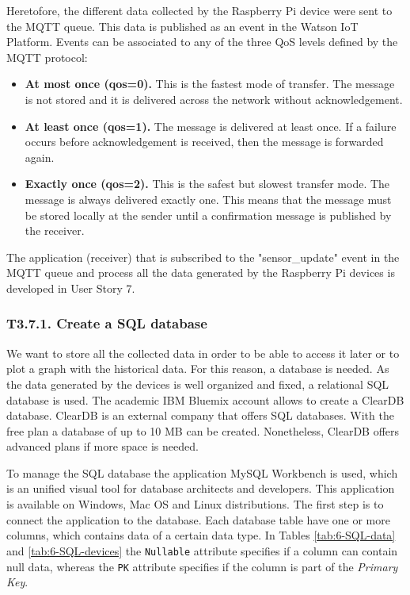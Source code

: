 Heretofore, the different data collected by the Raspberry Pi device were sent to the MQTT queue. This data is published as an event in the Watson \ac{IoT} Platform. Events can be associated to any of the three \ac{QoS} levels defined by the MQTT protocol:
\begin{itemize}
	\item \textbf{At most once (qos=0).} This is the fastest mode of transfer. The message is not stored and it is delivered across the network without acknowledgement.
	\item \textbf{At least once (qos=1).} The message is delivered at least once. If a failure occurs before acknowledgement is received, then the message is forwarded again.
	\item \textbf{Exactly once (qos=2).} This is the safest but slowest transfer mode. The message is always delivered exactly one. This means that the message must be stored locally at the sender until a confirmation message is published by the receiver.
\end{itemize}

The application (receiver) that is subscribed to the "sensor\_update" event in the MQTT queue and process all the data generated by the Raspberry Pi devices is developed in User Story 7.


\subsubsection{T3.7.1. Create a SQL database}

We want to store all the collected data in order to be able to access it later or to plot a graph with the historical data. For this reason, a database is needed. As the data generated by the devices is well organized and fixed, a relational SQL database is used. The academic IBM Bluemix account allows to create a ClearDB database. ClearDB is an external company that offers SQL databases. With the free plan a database of up to 10 MB can be created. Nonetheless, ClearDB offers advanced plans if more space is needed.

To manage the SQL database the application MySQL Workbench is used, which is an unified visual tool for database architects and developers. This application is available on Windows, Mac OS and Linux distributions. The first step is to connect the application to the database. Each database table have one or more columns, which contains data of a certain data type. In Tables \ref{tab:6-SQL-data} and \ref{tab:6-SQL-devices} the \texttt{Nullable} attribute specifies if a column can contain null data, whereas the \texttt{PK} attribute specifies if the column is part of the \textit{Primary Key}.

